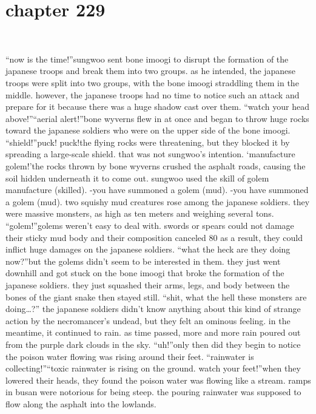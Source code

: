 \section{chapter 229}

                             




“now is the time!”sungwoo sent bone imoogi to disrupt the formation of the japanese troops and break them into two groups.
 as he intended, the japanese troops were split into two groups, with the bone imoogi straddling them in the middle.
however, the japanese troops had no time to notice such an attack and prepare for it because there was a huge shadow cast over them.
“watch your head above!”“aerial alert!”bone wyverns flew in at once and began to throw huge rocks toward the japanese soldiers who were on the upper side of the bone imoogi.
“shield!”puck! puck!the flying rocks were threatening, but they blocked it by spreading a large-scale shield.
 that was not sungwoo’s intention.
‘manufacture golem!’the rocks thrown by bone wyverns crushed the asphalt roads, causing the soil hidden underneath it to come out.
sungwoo used the skill of golem manufacture (skilled).
-you have summoned a golem (mud).
-you have summoned a golem (mud).
two squishy mud creatures rose among the japanese soldiers.
 they were massive monsters, as high as ten meters and weighing several tons.
“golem!”golems weren’t easy to deal with.
 swords or spears could not damage their sticky mud body and their composition canceled 80%
as a result, they could inflict huge damages on the japanese soldiers.
“what the heck are they doing now?”but the golems didn’t seem to be interested in them.
 they just went downhill and got stuck on the bone imoogi that broke the formation of the japanese soldiers.
they just squashed their arms, legs, and body between the bones of the giant snake then stayed still.
“shit, what the hell these monsters are doing…?”
the japanese soldiers didn’t know anything about this kind of strange action by the necromancer’s undead, but they felt an ominous feeling.
in the meantime, it continued to rain.
 as time passed, more and more rain poured out from the purple dark clouds in the sky.
“uh!”only then did they begin to notice the poison water flowing was rising around their feet.
“rainwater is collecting!”“toxic rainwater is rising on the ground.
 watch your feet!”when they lowered their heads, they found the poison water was flowing like a stream.
ramps in busan were notorious for being steep.
 the pouring rainwater was supposed to flow along the asphalt into the lowlands.
